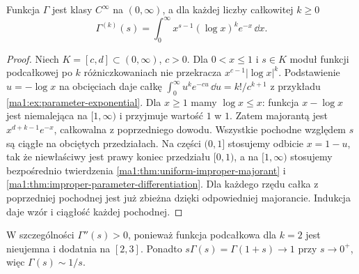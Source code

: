 \begin{twierdzenie}
\label{ma1:thm:gamma-smooth}
Funkcja $\Gamma$ jest klasy $C^\infty$ na $(0,\infty)$, a dla każdej liczby całkowitej $k\ge0$
\[
 \Gamma^{(k)}(s)=\int_0^\infty x^{s-1}(\log x)^ke^{-x}\,\dd x.
\]
\end{twierdzenie}
\begin{proof}
Niech $K=[c,d]\subset(0,\infty)$, $c>0$. Dla $0<x\le1$ i $s\in K$ moduł funkcji podcałkowej po $k$ różniczkowaniach nie przekracza $x^{c-1}|\log x|^k$. Podstawienie $u=-\log x$ na obcięciach daje całkę $\int_0^\infty u^ke^{-cu}\,\dd u=k!/c^{k+1}$ z przykładu \ref{ma1:ex:parameter-exponential}. Dla $x\ge1$ mamy $\log x\le x$: funkcja $x-\log x$ jest niemalejąca na $[1,\infty)$ i przyjmuje wartość $1$ w $1$. Zatem majorantą jest $x^{d+k-1}e^{-x}$, całkowalna z poprzedniego dowodu. Wszystkie pochodne względem $s$ są ciągłe na obciętych przedziałach. Na części $(0,1]$ stosujemy odbicie $x=1-u$, tak że niewłaściwy jest prawy koniec przedziału $[0,1)$, a na $[1,\infty)$ stosujemy bezpośrednio twierdzenia \ref{ma1:thm:uniform-improper-majorant} i \ref{ma1:thm:improper-parameter-differentiation}. Dla każdego rzędu całka z poprzedniej pochodnej jest już zbieżna dzięki odpowiedniej majorancie. Indukcja daje wzór i ciągłość każdej pochodnej.
\end{proof}
W szczególności $\Gamma''(s)>0$, ponieważ funkcja podcałkowa dla $k=2$ jest nieujemna i dodatnia na $[2,3]$. Ponadto $s\Gamma(s)=\Gamma(1+s)\to1$ przy $s\to0^+$, więc $\Gamma(s)\sim1/s$.

